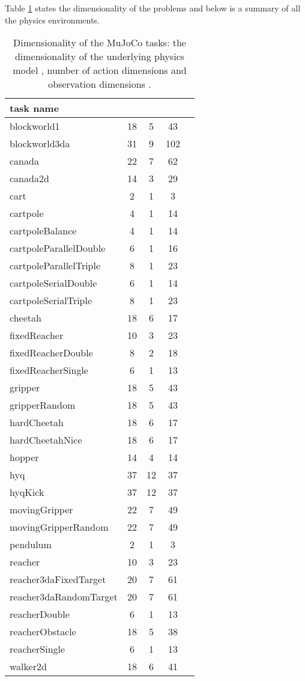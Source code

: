 \documentclass{article} \usepackage{iclr2016_conference,times}
\begin{document}
Table \ref{table:dims} states the
dimensionality of the problems and below is a summary
of all the physics environments.


\begin{table}[h]
\begin{center}
  \begin{tabular}{ l | c | c | c | c }
\textbf{task name }&   & 
      &  \\
      \hline
      blockworld1 & 18 & 5 & 43\\
blockworld3da & 31 & 9 & 102\\
canada & 22 & 7 & 62\\
canada2d & 14 & 3 & 29\\
cart & 2 & 1 & 3\\
cartpole & 4 & 1 & 14\\
cartpoleBalance & 4 & 1 & 14\\
cartpoleParallelDouble & 6 & 1 & 16\\
cartpoleParallelTriple & 8 & 1 & 23\\
cartpoleSerialDouble & 6 & 1 & 14\\
cartpoleSerialTriple & 8 & 1 & 23\\
cheetah & 18 & 6 & 17\\
fixedReacher & 10 & 3 & 23\\
fixedReacherDouble & 8 & 2 & 18\\
fixedReacherSingle & 6 & 1 & 13\\
gripper & 18 & 5 & 43\\
gripperRandom & 18 & 5 & 43\\
hardCheetah & 18 & 6 & 17\\
hardCheetahNice & 18 & 6 & 17\\
hopper & 14 & 4 & 14\\
hyq & 37 & 12 & 37\\
hyqKick & 37 & 12 & 37\\
movingGripper & 22 & 7 & 49\\
movingGripperRandom & 22 & 7 & 49\\
pendulum & 2 & 1 & 3\\
reacher & 10 & 3 & 23\\
reacher3daFixedTarget & 20 & 7 & 61\\
reacher3daRandomTarget & 20 & 7 & 61\\
reacherDouble & 6 & 1 & 13\\
reacherObstacle & 18 & 5 & 38\\
reacherSingle & 6 & 1 & 13\\
walker2d & 18 & 6 & 41\\
   \end{tabular}
  \caption{
    Dimensionality of the MuJoCo tasks: the dimensionality
    of the underlying physics model , number
    of action dimensions  and observation dimensions .
    } \label{table:dims}
\end{center}
\end{table}
\end{document}
